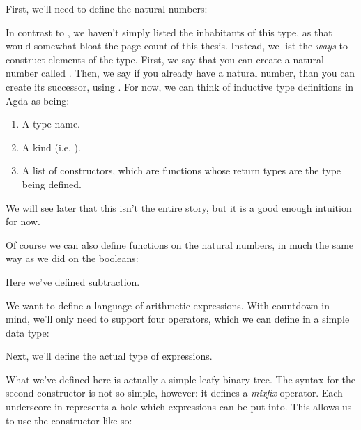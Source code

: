 First, we'll need to define the natural numbers:
\begin{agdalisting}
\end{agdalisting}
In contrast to , we haven't simply listed the inhabitants of
this type, as that would somewhat bloat the page count of this thesis.
Instead, we list the \emph{ways} to construct elements of the type.
First, we say that you can create a natural number called
.
Then, we say if you already have a natural number, than you can create its
successor, using .
For now, we can think of inductive type definitions in Agda as being:
\begin{enumerate}
  \item A type name.
  \item A kind (i.e. ).
  \item A list of constructors, which are functions whose return types are the
    type being defined.
\end{enumerate}
We will see later that this isn't the entire story, but it is a good enough
intuition for now.

Of course we can also define functions on the natural numbers, in much the same
way as we did on the booleans:
\begin{agdalisting} \label{sub-def}
\end{agdalisting}
Here we've defined subtraction.

We want to define a language of arithmetic expressions.
With countdown in mind, we'll only need to support four operators, which we can
define in a simple data type:
\begin{agdalisting}
\end{agdalisting}

Next, we'll define the actual type of expressions.
\begin{agdalisting}
\end{agdalisting}
What we've defined here is actually a simple leafy binary tree.
The syntax for the second constructor is not so simple, however: it defines a
\emph{mixfix} operator.
Each underscore in \AgdaInductiveConstructor{\(\_\langle \_ \rangle\_\)}
represents a hole which expressions can be put into.
This allows us to use the constructor like so:
\begin{agdalisting}
\end{agdalisting}
